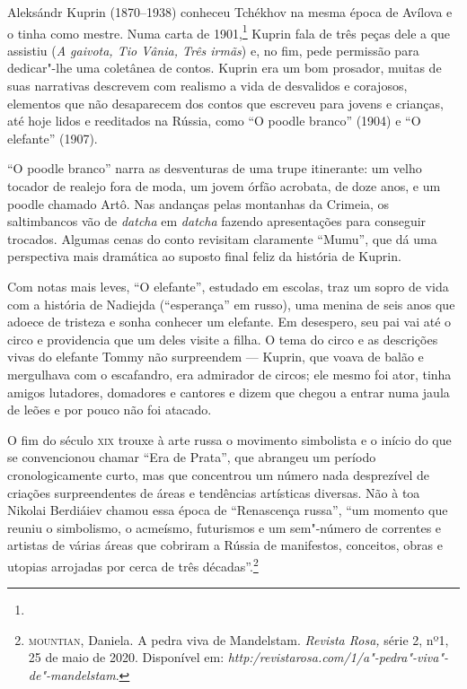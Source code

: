Aleksándr Kuprin (1870--1938) conheceu Tchékhov na mesma época de
Avílova e o tinha como mestre. Numa carta de 1901,\footnote{} Kuprin fala de três peças
dele a que assistiu (\emph{A gaivota, Tio Vânia, Três irmãs}) e, no fim,
pede permissão para dedicar"-lhe uma coletânea de contos. Kuprin era um
bom prosador, muitas de suas narrativas descrevem com realismo a vida de
desvalidos e corajosos, elementos que não desaparecem dos contos que
escreveu para jovens e crianças, até hoje lidos e reeditados na Rússia,
como ``O poodle branco'' (1904) e ``O elefante'' (1907).

``O poodle branco'' narra as desventuras de uma trupe itinerante:
um velho tocador de realejo fora de moda, um jovem órfão acrobata, de
doze anos, e um poodle chamado Artô. Nas andanças pelas montanhas da
Crimeia, os saltimbancos vão de \emph{datcha} em \emph{datcha} fazendo
apresentações para conseguir trocados. Algumas cenas do conto revisitam
claramente ``Mumu'', que dá uma perspectiva mais dramática ao
suposto final feliz da história de Kuprin.

Com notas mais leves, ``O elefante'', estudado em escolas, traz um sopro
de vida com a história de Nadiejda (``esperança'' em russo), uma menina
de seis anos que adoece de tristeza e sonha conhecer um elefante. Em
desespero, seu pai vai até o circo e providencia que um deles visite a
filha. O tema do circo e as descrições vivas do elefante Tommy não
surpreendem --- Kuprin, que voava de balão e mergulhava com o
escafandro, era admirador de circos; ele mesmo foi ator, tinha amigos
lutadores, domadores e cantores e dizem que chegou a entrar numa jaula
de leões e por pouco não foi atacado.

O fim do século \textsc{xix} trouxe à arte russa o movimento simbolista e o
início do que se convencionou chamar ``Era de Prata'', que abrangeu um
período cronologicamente curto, mas que concentrou um número nada
desprezível de criações surpreendentes de áreas e tendências artísticas
diversas. Não à toa Nikolai Berdiáiev chamou essa época de ``Renascença
russa'', ``um momento que reuniu o simbolismo, o acmeísmo, futurismos e
um sem"-número de correntes e artistas de várias áreas que cobriram a
Rússia de manifestos, conceitos, obras e utopias arrojadas por cerca de
três décadas''.\footnote{\textsc{mountian}, Daniela. A pedra viva de Mandelstam.
  \emph{Revista Rosa,} série 2, nº1, 25 de maio de 2020. Disponível em:
  \emph{http:/revistarosa.com/1/a"-pedra"-viva"-de"-mandelstam}.}


